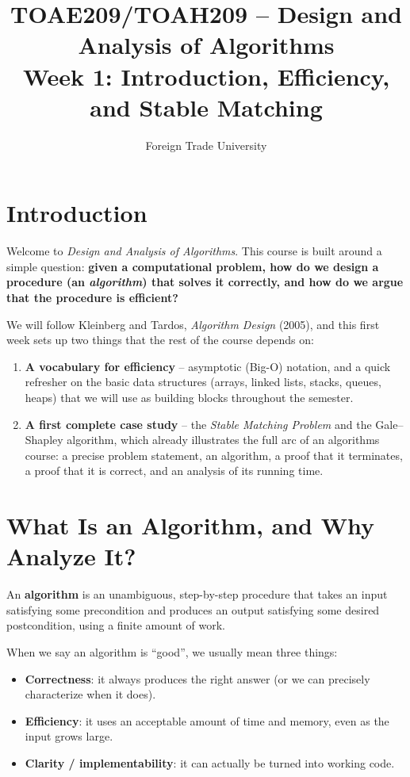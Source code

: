 \documentclass[11pt]{article}
\title{TOAE209/TOAH209 -- Design and Analysis of Algorithms\\[4pt]
\large Week 1: Introduction, Efficiency, and Stable Matching}
\author{Foreign Trade University}
\date{}
\begin{document}
\maketitle
\tableofcontents

\section{Introduction}

Welcome to \emph{Design and Analysis of Algorithms}. This course is built around a simple
question: \textbf{given a computational problem, how do we design a procedure (an
\emph{algorithm}) that solves it correctly, and how do we argue that the procedure is
efficient?}

We will follow Kleinberg and Tardos, \emph{Algorithm Design} (2005), and this first week
sets up two things that the rest of the course depends on:

\begin{enumerate}
    \item \textbf{A vocabulary for efficiency} -- asymptotic (Big-O) notation, and a quick
    refresher on the basic data structures (arrays, linked lists, stacks, queues, heaps)
    that we will use as building blocks throughout the semester.
    \item \textbf{A first complete case study} -- the \emph{Stable Matching Problem} and
    the Gale--Shapley algorithm, which already illustrates the full arc of an algorithms
    course: a precise problem statement, an algorithm, a proof that it terminates, a proof
    that it is correct, and an analysis of its running time.
\end{enumerate}

\section{What Is an Algorithm, and Why Analyze It?}

An \textbf{algorithm} is an unambiguous, step-by-step procedure that takes an input
satisfying some precondition and produces an output satisfying some desired
postcondition, using a finite amount of work.

When we say an algorithm is ``good'', we usually mean three things:

\begin{itemize}
    \item \textbf{Correctness}: it always produces the right answer (or we can precisely
    characterize when it does).
    \item \textbf{Efficiency}: it uses an acceptable amount of time and memory, even as the
    input grows large.
    \item \textbf{Clarity / implementability}: it can actually be turned into working code.
\end{itemize}
\end{document}
